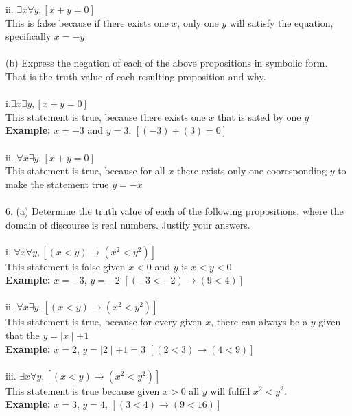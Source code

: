 \documentclass[10pt]{article}
\begin{document}
ii. $\exists x \forall y, [x + y = 0]$\\
This is false because if there exists one $x$, only one $y$ will satisfy the equation, specifically $x = -y$\\~\\



(b) Express the negation of each of the above propositions in symbolic form.  That is the truth value of each resulting proposition and why.\\~\\

i.$\exists x \exists y, [x + y = 0]$\\
This statement is true, because there exists one $x$ that is sated by one $y$\\
\textbf{Example:} $x = -3$ and $y = 3$, $[(-3) + (3) = 0]$\\~\\

ii. $\forall x \exists y, [x + y = 0]$\\
This statement is true, because for all $x$ there exists only one cooresponding $y$ to make the statement true $y= -x$\\~\\



6. (a) Determine the truth value of each of the following propositions, where the domain of discourse is real numbers.  Justify your answers.\\~\\

i. $\forall x \forall y, [(x < y) \rightarrow (x^2 < y^2)]$\\
This statement is false given $x < 0$ and $y$ is $x < y < 0$\\
\textbf{Example:} $x = -3$, $y = -2$ $[(-3 < -2) \rightarrow (9 < 4)]$\\~\\

ii. $\forall x \exists y, [(x < y) \rightarrow (x^2 < y^2)]$\\
This statement is true, because for every given $x$, there can always be a $y$ given that the $y = \mid x \mid + 1$\\
\textbf{Example:} $x = 2$, $y = \mid 2 \mid + 1 = 3$ $[(2 < 3) \rightarrow (4 < 9)]$\\~\\

iii. $\exists x \forall y, [(x < y) \rightarrow (x^2 < y^2)]$\\
This statement is true because given $x > 0$ all $y$ will fulfill $x^2 < y^2$.\\
\textbf{Example:} $x = 3$, $y = 4$,  $[(3 < 4) \rightarrow (9 < 16)]$\\~\\
\end{document}
